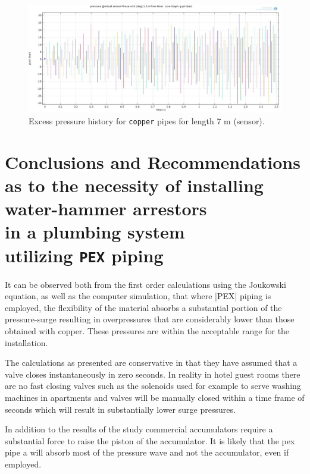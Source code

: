 \begin{figure}[htbp]
\hspace*{-0.1\textwidth}\includegraphics[width=1.2\textwidth]{./water-hammer/copper/CO-7-sensor}
\caption{Excess pressure history for \texttt{copper} pipes for length 7 m (sensor).}
\label{co4}
\end{figure}




\chapter[Conclusions and Recommendations as to the necessity of installing water-hammer arrestors in a plumbing system utilizing \texttt{PEX} piping]{\color{spot!50} Conclusions and Recommendations as to the necessity of installing water-hammer arrestors\\ in a plumbing system\\ utilizing \texttt{PEX} piping}

It can be observed both from the first order calculations using the Joukowski equation, as well as the computer simulation, that where |PEX| piping is employed, the flexibility of the material absorbs a substantial portion of the pressure-surge resulting in overpressures that are considerably lower than those obtained with copper. These pressures are within the acceptable range for the installation.

The calculations as presented are conservative in that they have assumed that a valve closes instantaneously in zero seconds. In reality in hotel guest rooms there are no fast closing valves such as the solenoids used for example to serve washing machines in apartments and valves will be manually closed within a time frame of seconds which will result in substantially lower surge pressures.

In addition to the results of the study commercial accumulators require a substantial force to raise the piston of the accumulator. 
It is likely that  the pex pipe a will absorb most of the pressure wave and not the accumulator, even if employed. 

